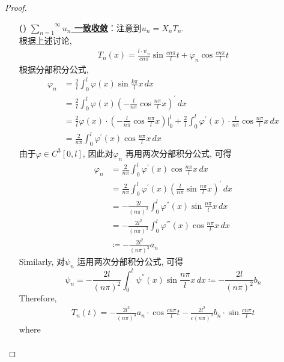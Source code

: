 \begin{thm}
\begin{proof}
\begin{itemize}
\begin{enumerate}
					\begin{enumerate}
						\item[\textbf{(\rmnum{1})}]\underline{\textbf{$\overset{\infty}{\underset{n = 1}{\sum}} u_n$ 一致收敛}}：注意到$u_n = X_n T_n$. \\
						根据上述讨论, 
						\begin{align*}
							T_n(x) = \frac{l \cdot \psi_n}{cn\pi} \sin \frac{cn\pi}{l} t + \varphi_n \cos \frac{cn\pi}{l} t
						\end{align*}
						根据分部积分公式, 
						\begin{align*}
							\varphi_n 
							&= \frac{2}{l} \int_{0}^l \varphi(x) \sin \frac{k\pi}{l} x \, dx \\
							&= \frac{2}{l} \int_{0}^l \varphi(x) \left( -\frac{l}{n\pi} \cos \frac{n\pi}{l} x \right)^{'} \, dx \\
							&= \frac{2}{l} \varphi(x) \cdot \left( -\frac{l}{n\pi} \cos \frac{n\pi}{l} x \right) \Big|_{0}^{l} + \frac{2}{l} \int_{0}^l \varphi^{'}(x) \cdot \frac{l}{n\pi} \cos \frac{n\pi}{l} x \, dx \\
							&= \frac{2}{n\pi} \int_{0}^l \varphi^{'}(x) \cos \frac{n\pi}{l} x \, dx
						\end{align*}
						由于$\varphi \in C^{3}[0 , l]$, 因此对$\varphi_n$ 再用两次分部积分公式, 可得
						\begin{align*}
							\varphi_n 
							&= \frac{2}{n\pi} \int_{0}^l \varphi^{'}(x) \cos \frac{n\pi}{l} x \, dx \\
							&= \frac{2}{n\pi} \int_{0}^l \varphi^{'}(x) \left( \frac{l}{n\pi} \sin \frac{n\pi}{l} x \right)^{'} \, dx \\
							&= -\frac{2l}{(n\pi)^2} \int_{0}^l \varphi^{''}(x) \sin \frac{n\pi}{l} x \, dx \\
							&= -\frac{2l^2}{(n\pi)^3} \int_{0}^l \varphi^{'''}(x) \cos \frac{n\pi}{l} x \, dx \\
							&\coloneqq -\frac{2l^2}{(n\pi)^3} a_n
						\end{align*}
						Similarly, 对$\psi_n$ 运用两次分部积分公式, 可得
						\[ \psi_n = -\frac{2l}{(n\pi)^2} \int_{0}^l \psi^{''}(x) \sin \frac{n\pi}{l} x \, dx \coloneqq -\frac{2l}{(n\pi)^2} b_n \]
						Therefore, 
						\begin{align*}
							T_n(t) = -\frac{2l^2}{(n \pi)^3} a_n \cdot \cos \frac{cn\pi}{l} t - \frac{2l^2}{c(n\pi)^3} b_n \cdot \sin \frac{cn\pi}{l} t
						\end{align*}
						where 
						\begin{align*}

\end{align*}
\end{enumerate}
\end{enumerate}
\end{itemize}
\end{proof}
\end{thm}
